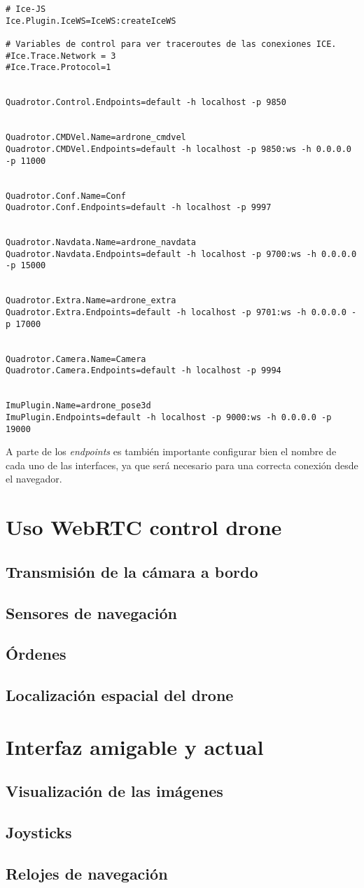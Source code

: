 \begin{lstlisting}[caption=Archivo de configuracion]
# Ice-JS
Ice.Plugin.IceWS=IceWS:createIceWS

# Variables de control para ver traceroutes de las conexiones ICE.
#Ice.Trace.Network = 3
#Ice.Trace.Protocol=1


Quadrotor.Control.Endpoints=default -h localhost -p 9850


Quadrotor.CMDVel.Name=ardrone_cmdvel
Quadrotor.CMDVel.Endpoints=default -h localhost -p 9850:ws -h 0.0.0.0 -p 11000


Quadrotor.Conf.Name=Conf
Quadrotor.Conf.Endpoints=default -h localhost -p 9997


Quadrotor.Navdata.Name=ardrone_navdata
Quadrotor.Navdata.Endpoints=default -h localhost -p 9700:ws -h 0.0.0.0 -p 15000


Quadrotor.Extra.Name=ardrone_extra
Quadrotor.Extra.Endpoints=default -h localhost -p 9701:ws -h 0.0.0.0 -p 17000


Quadrotor.Camera.Name=Camera
Quadrotor.Camera.Endpoints=default -h localhost -p 9994


ImuPlugin.Name=ardrone_pose3d
ImuPlugin.Endpoints=default -h localhost -p 9000:ws -h 0.0.0.0 -p 19000
\end{lstlisting}

A parte de los \emph{endpoints} es también importante configurar bien el nombre de cada uno de las interfaces, ya que será necesario para una correcta conexión desde el navegador.\\

\section{Uso WebRTC control drone}
\subsection{Transmisión de la cámara a bordo}
\subsection{Sensores de navegación}
\subsection{Órdenes}
\subsection{Localización espacial del drone}


\section{Interfaz amigable y actual}
\subsection{Visualización de las imágenes}
\subsection{Joysticks}
\subsection{Relojes de navegación}